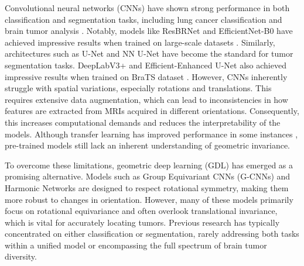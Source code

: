 Convolutional neural networks (CNNs) have shown strong performance in both classification and segmentation tasks, including lung cancer classification \cite{7} and brain tumor analysis \cite{8,9,10}. Notably, models like ResBRNet and EfficientNet-B0 have achieved impressive results when trained on large-scale datasets \cite{11}. Similarly, architectures such as U-Net \cite{12} and NN U-Net \cite{13} have become the standard for tumor segmentation tasks. DeepLabV3+ and Efficient-Enhanced U-Net also achieved impressive results when trained on BraTS dataset \cite{14,15}. However, CNNs inherently struggle with spatial variations, especially rotations and translations. This requires extensive data augmentation, which can lead to inconsistencies in how features are extracted from MRIs acquired in different orientations. Consequently, this increases computational demands and reduces the interpretability of the models. Although transfer learning has improved performance in some instances \cite{16}, pre-trained models still lack an inherent understanding of geometric invariance.

To overcome these limitations, geometric deep learning (GDL) has emerged as a promising alternative. Models such as Group Equivariant CNNs (G-CNNs) \cite{17} and Harmonic Networks \cite{18} are designed to respect rotational symmetry, making them more robust to changes in orientation. However, many of these models primarily focus on rotational equivariance and often overlook translational invariance, which is vital for accurately locating tumors. Previous research has typically concentrated on either classification or segmentation, rarely addressing both tasks within a unified model or encompassing the full spectrum of brain tumor diversity.

